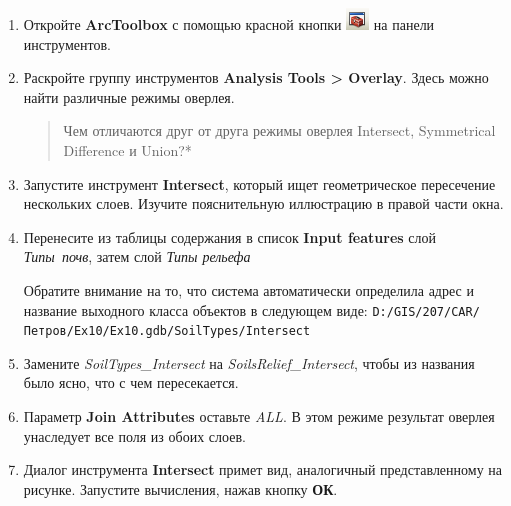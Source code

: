 \documentclass[12pt,]{book}
\begin{document}
\begin{enumerate}
\def\labelenumi{\arabic{enumi}.}
\item
  Откройте \textbf{ArcToolbox} с помощью красной кнопки \includegraphics{images/Ex10/image8.png} на панели инструментов.
\item
  Раскройте группу инструментов \textbf{Analysis Tools \textgreater{} Overlay}. Здесь можно найти различные режимы оверлея.

  \begin{quote}
  Чем отличаются друг от друга режимы оверлея Intersect, Symmetrical Difference и Union?*
  \end{quote}
\item
  Запустите инструмент \textbf{Intersect}, который ищет геометрическое пересечение нескольких слоев. Изучите пояснительную иллюстрацию в правой части окна.
\item
  Перенесите из таблицы содержания в список \textbf{Input features} слой \emph{Типы~почв}, затем слой \emph{Типы рельефа}

  Обратите внимание на то, что система автоматически определила адрес и
  название выходного класса объектов в следующем виде:
  \texttt{D:/GIS/207/CAR/Петров/Ex10/Ex10.gdb/SoilTypes/Intersect}
\item
  Замените \emph{SoilTypes\_Intersect} на \emph{SoilsRelief\_Intersect}, чтобы из названия было ясно, что с чем пересекается.
\item
  Параметр \textbf{Join Attributes} оставьте \emph{ALL}. В этом режиме результат оверлея унаследует все поля из обоих слоев.
\item
  Диалог инструмента \textbf{Intersect} примет вид, аналогичный представленному на рисунке. Запустите вычисления, нажав кнопку \textbf{ОК}.


\end{enumerate}
\end{document}
